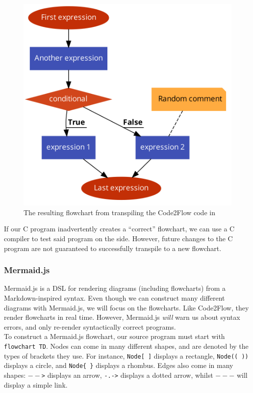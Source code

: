 \begin{figure}[ht]
    \centering
    \includegraphics[scale=0.2]{assets/code2flow_example.png}
    \caption{The resulting flowchart from transpiling the Code2Flow code in }
    \label{A Code2Flow flowchart.}
\end{figure}

If our C program inadvertently creates a ``correct'' flowchart, we can use a C compiler to test said program on the side. However, future changes to the C program are not guaranteed to successfully transpile to a new flowchart.

\subsubsection{Mermaid.js}

Mermaid.js is a DSL for rendering diagrams (including flowcharts) from a Markdown-inspired syntax. Even though we can construct many different diagrams with Mermaid.js, we will focus on the flowcharts. Like Code2Flow, they render flowcharts in real time. However, Mermaid.js \textit{will} warn us about syntax errors, and only re-render syntactically correct programs. \\

To construct a Mermaid.js flowchart, our source program must start with \texttt{flowchart TD}. Nodes can come in many different shapes, and are denoted by the types of brackets they use. For instance, \texttt{Node[ ]} displays a rectangle, \texttt{Node(( ))} displays a circle, and \texttt{Node\{ \}} displays a rhombus. Edges also come in many shapes: \texttt{$--$>} displays an arrow, \texttt{-.->} displays a dotted arrow, whilst \texttt{$---$} will display a simple link. \\

